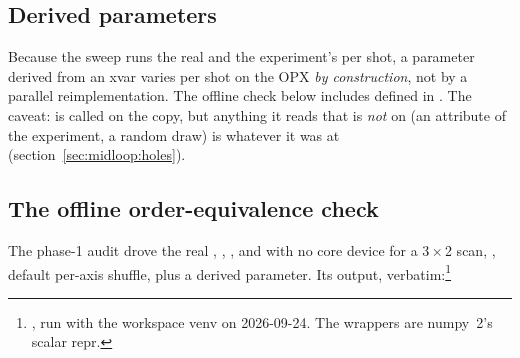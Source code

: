 \subsection{Derived parameters}

Because the sweep runs the real  and the
experiment's  per shot, a parameter derived from
an xvar varies per shot on the OPX \emph{by construction}, not by a parallel
reimplementation. The offline check below includes 
defined in . The caveat: 
is called on the copy, but anything it reads that is \emph{not} on
 (an attribute of the experiment, a random draw) is whatever
it was at  (section~\ref{sec:midloop:holes}).

\subsection{The offline order-equivalence check}
\label{sec:xvars:check}

The phase-1 audit drove the real , ,
,  and  with no
core device for a 3\,$\times$\,2 scan, , default per-axis
shuffle, plus a derived parameter. Its output, verbatim:\footnote{,
run with the workspace venv on 2026-09-24. The  wrappers
are numpy~2's scalar repr.}

